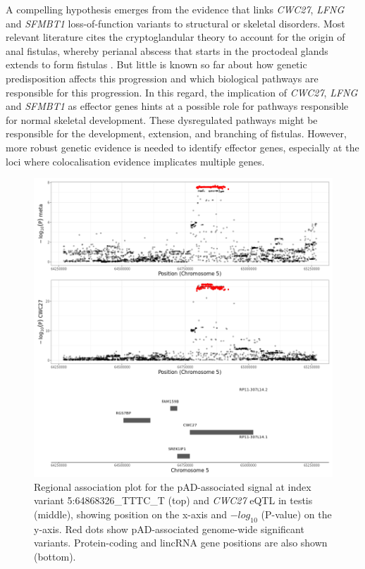   A compelling hypothesis emerges from the evidence that links \textit{CWC27}, \textit{LFNG} and \textit{SFMBT1} loss-of-function variants to structural or skeletal disorders. Most relevant literature cites the cryptoglandular theory to account for the origin of anal fistulas, whereby perianal abscess that starts in the proctodeal glands extends to form fistulas \cite{Wlodarczyk2021-xw}. But little is known so far about how genetic predisposition affects this progression and which biological pathways are responsible for this progression. In this regard, the implication of \textit{CWC27}, \textit{LFNG} and \textit{SFMBT1} as effector genes hints at a possible role for pathways responsible for normal skeletal development. These dysregulated pathways might be responsible for the development, extension, and branching of fistulas. However, more robust genetic evidence is needed to identify effector genes, especially at the loci where colocalisation evidence implicates multiple genes.


  \begin{figure}[H]
    \centering    
    \includegraphics[width=1.0\textwidth]{Vector/cwc27_testis.png}
    \caption[Regional association plots of the pAD-associated locus at index variant 5:64868326\_TTTC\_T and a \textit{CWC27} eQTL in testis]{Regional association plot for the pAD-associated signal at index variant 5:64868326\_TTTC\_T (top) and \textit{CWC27} eQTL in testis (middle), showing position on the x-axis and $-log_{10}$ (P-value) on the y-axis. Red dots show pAD-associated genome-wide significant variants. Protein-coding and lincRNA gene positions are also shown (bottom).}
    \label{fig:cwc27_testis}
    \end{figure}





